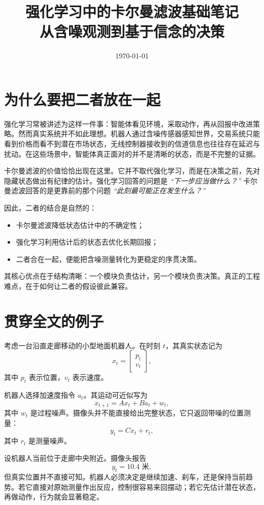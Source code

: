 \documentclass[12pt,a4paper]{ctexart}
\title{强化学习中的卡尔曼滤波基础笔记\\
\large 从含噪观测到基于信念的决策}
\author{}
\date{\today}
\begin{document}
\maketitle
\tableofcontents

\section{为什么要把二者放在一起}

强化学习常被讲述为这样一件事：智能体看见环境，采取动作，再从回报中改进策略。然而真实系统并不如此理想。机器人通过含噪传感器感知世界，交易系统只能看到价格而看不到潜在市场状态，无线控制器接收到的信道信息也往往存在延迟与扰动。在这些场景中，智能体真正面对的并不是清晰的状态，而是不完整的证据。

卡尔曼滤波的价值恰恰出现在这里。它并不取代强化学习，而是在决策之前，先对隐藏状态做出有纪律的估计。强化学习回答的问题是
\emph{“下一步应当做什么？”}
卡尔曼滤波回答的是更靠前的那个问题
\emph{“此刻最可能正在发生什么？”}

因此，二者的结合是自然的：
\begin{itemize}
  \item 卡尔曼滤波降低状态估计中的不确定性；
  \item 强化学习利用估计后的状态去优化长期回报；
  \item 二者合在一起，便能把含噪测量转化为更稳定的序贯决策。
\end{itemize}

其核心优点在于结构清晰：一个模块负责估计，另一个模块负责决策。真正的工程难点，在于如何让二者的假设彼此兼容。

\section{贯穿全文的例子}

考虑一台沿直走廊移动的小型地面机器人。在时刻 \(t\)，其真实状态记为
\[
x_t =
\begin{bmatrix}
p_t\\
v_t
\end{bmatrix},
\]
其中 \(p_t\) 表示位置，\(v_t\) 表示速度。

机器人选择加速度指令 \(a_t\)。其运动可近似写为
\[
x_{t+1} = A x_t + B a_t + w_t,
\]
其中 \(w_t\) 是过程噪声。摄像头并不能直接给出完整状态，它只返回带噪的位置测量：
\[
y_t = C x_t + r_t,
\]
其中 \(r_t\) 是测量噪声。

设机器人当前位于走廊中央附近。摄像头报告
\[
y_t = 10.4 \text{ 米},
\]
但真实位置并不直接可知。机器人必须决定是继续加速、刹车，还是保持当前趋势。若它直接对原始测量作出反应，控制很容易来回摆动；若它先估计潜在状态，再做动作，行为就会显著稳定。
\end{document}
